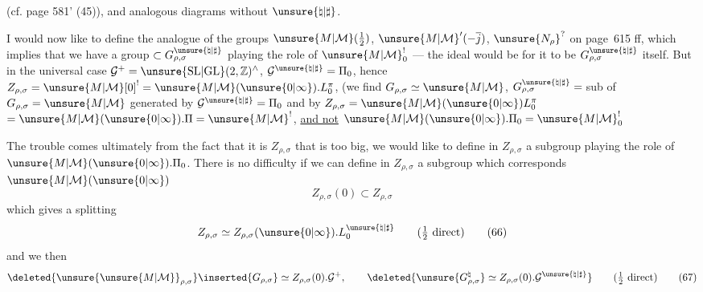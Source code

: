 (cf. page 581' (45)), and analogous diagrams without $\unsure{\natural|\sharp}$.





I would now like to define the analogue of the groups
$\unsure{M|\mathcal{M}}(\tfrac12)$, $\unsure{M|\mathcal{M}}'(-\overline j)$,
$\unsure{N_\rho}^{?}$
on page~615 ff,
which implies that we have a group $\subset G_{\rho,\sigma}^{\unsure{\natural|\sharp}}$
playing the role of $\unsure{M|\mathcal{M}}^{!}_0$ --- the ideal would be for it to be
$G_{\rho,\sigma}^{\unsure{\natural|\sharp}}$ itself.
But in the universal case
$\mathcal{G}^+=\unsure{\mathrm{SL}|\mathrm{GL}}(2,\mathbb Z)^\wedge$,
$\mathcal{G}^{\unsure{\natural|\sharp}}=\Pi_0$,
hence
$Z_{\rho,\sigma}=\unsure{M|\mathcal{M}}[0]^{!}=\unsure{M|\mathcal{M}}(\unsure{0|\infty}).L_0^\pi$,
(we find $G_{\rho,\sigma}\simeq \unsure{M|\mathcal{M}}$,
$G_{\rho,\sigma}^{\unsure{\natural|\sharp}}={}$sub
of $G_{\rho,\sigma}=\unsure{M|\mathcal{M}}$ generated by
$\mathcal{G}^{\unsure{\natural|\sharp}}=\Pi_0$
and by $Z_{\rho,\sigma}=\unsure{M|\mathcal{M}}(\unsure{0|\infty})L_0^\pi$
$=\unsure{M|\mathcal{M}}(\unsure{0|\infty}).\Pi=\unsure{M|\mathcal{M}}^{!}$,
\uline{and not} $\unsure{M|\mathcal{M}}(\unsure{0|\infty}).\Pi_0=\unsure{M|\mathcal{M}}^{!}_0$\deleted{$\unsure{!}$}

The trouble comes ultimately from the fact that it is $Z_{\rho,\sigma}$
that is too big, we would like to define in $Z_{\rho,\sigma}$ a subgroup
playing the role of $\unsure{M|\mathcal{M}}(\unsure{0|\infty}).\Pi_0$. There is no difficulty if we can define
in  $Z_{\rho,\sigma}$ a subgroup which
corresponds  $\unsure{M|\mathcal{M}}(\unsure{0|\infty})$
\[
Z_{\rho,\sigma}(0)\subset Z_{\rho,\sigma}
\tag{65}
\]
which gives a splitting
\[
Z_{\rho,\sigma}\simeq Z_{\rho,\sigma}(\unsure{0|\infty}).L_0^{\unsure{\natural|\sharp}}
\qquad (\tfrac12\ \text{direct})
\tag{66}
\]
and we  then
\[
\deleted{\unsure{\unsure{M|\mathcal{M}}}_{\rho,\sigma}}\inserted{G_{\rho,\sigma}}
\simeq Z_{\rho,\sigma}(0).\mathcal{G}^+,
\qquad
\deleted{\unsure{G_{\rho,\sigma}^{\natural}}\simeq
Z_{\rho,\sigma}(0).\mathcal{G}^{\unsure{\natural|\sharp}}}
\qquad (\tfrac12\ \text{direct})
\tag{67}
\]


